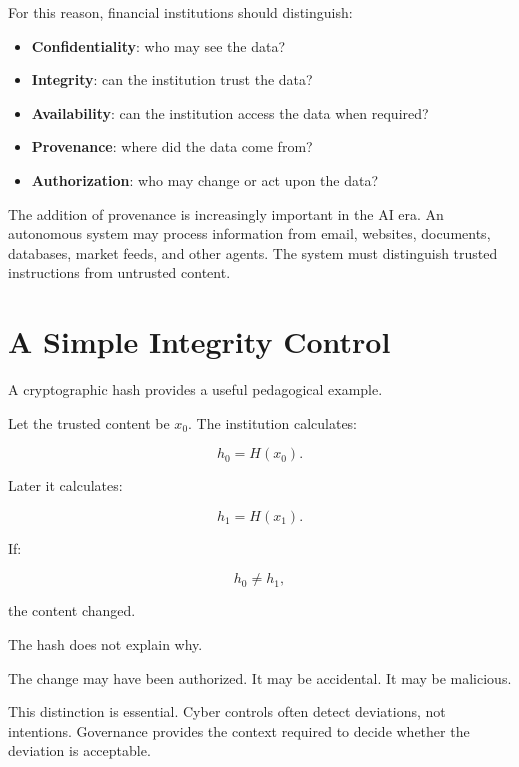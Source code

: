 For this reason, financial institutions should distinguish:

\begin{itemize}
    \item \textbf{Confidentiality}: who may see the data?
    \item \textbf{Integrity}: can the institution trust the data?
    \item \textbf{Availability}: can the institution access the data when required?
    \item \textbf{Provenance}: where did the data come from?
    \item \textbf{Authorization}: who may change or act upon the data?
\end{itemize}

The addition of provenance is increasingly important in the AI era. An autonomous system may process information from email, websites, documents, databases, market feeds, and other agents. The system must distinguish trusted instructions from untrusted content.

\section{A Simple Integrity Control}

A cryptographic hash provides a useful pedagogical example.

Let the trusted content be \(x_0\). The institution calculates:

\begin{equation}
h_0 = H(x_0).
\end{equation}

Later it calculates:

\begin{equation}
h_1 = H(x_1).
\end{equation}

If:

\begin{equation}
h_0 \neq h_1,
\end{equation}

the content changed.

The hash does not explain why.

The change may have been authorized. It may be accidental. It may be malicious.

This distinction is essential. Cyber controls often detect deviations, not intentions. Governance provides the context required to decide whether the deviation is acceptable.

